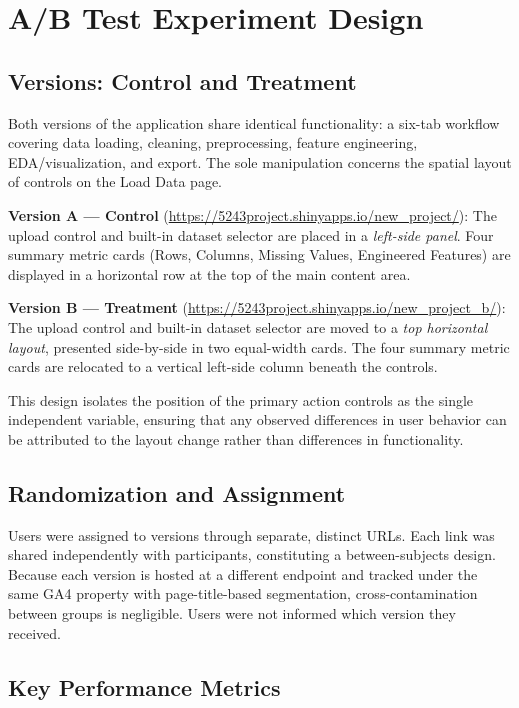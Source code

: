 \documentclass{article}
\begin{document}
\section{A/B Test Experiment Design}

\subsection{Versions: Control and Treatment}

Both versions of the application share identical functionality: a six-tab workflow covering data loading, cleaning, preprocessing, feature engineering, EDA/visualization, and export. The sole manipulation concerns the spatial layout of controls on the Load Data page.

\textbf{Version A --- Control} (\url{https://5243project.shinyapps.io/new_project/}): The upload control and built-in dataset selector are placed in a \emph{left-side panel}. Four summary metric cards (Rows, Columns, Missing Values, Engineered Features) are displayed in a horizontal row at the top of the main content area.

\textbf{Version B --- Treatment} (\url{https://5243project.shinyapps.io/new_project_b/}): The upload control and built-in dataset selector are moved to a \emph{top horizontal layout}, presented side-by-side in two equal-width cards. The four summary metric cards are relocated to a vertical left-side column beneath the controls.

This design isolates the position of the primary action controls as the single independent variable, ensuring that any observed differences in user behavior can be attributed to the layout change rather than differences in functionality.

\subsection{Randomization and Assignment}

Users were assigned to versions through separate, distinct URLs. Each link was shared independently with participants, constituting a between-subjects design. Because each version is hosted at a different endpoint and tracked under the same GA4 property with page-title-based segmentation, cross-contamination between groups is negligible. Users were not informed which version they received.

\subsection{Key Performance Metrics}
\end{document}
